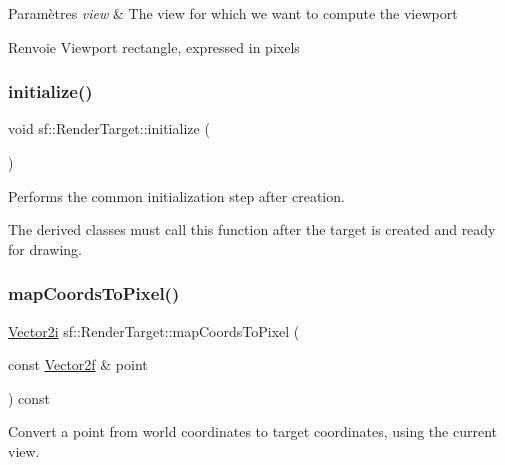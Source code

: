 \begin{DoxyParams}{Paramètres}
{\em view} & The view for which we want to compute the viewport\\
\hline
\end{DoxyParams}
\begin{DoxyReturn}{Renvoie}
Viewport rectangle, expressed in pixels 
\end{DoxyReturn}
\mbox{\label{classsf_1_1RenderTarget_af530274b34159d644e509b4b4dc43eb7}} 
\subsubsection{\texorpdfstring{initialize()}{initialize()}}
{\footnotesize\ttfamily void sf\+::\+Render\+Target\+::initialize (\begin{DoxyParamCaption}{ }\end{DoxyParamCaption})\hspace{0.3cm}{\ttfamily [protected]}}



Performs the common initialization step after creation. 

The derived classes must call this function after the target is created and ready for drawing. \mbox{\label{classsf_1_1RenderTarget_ad92a9f0283aa5f3f67e473c1105b68cf}} 
\subsubsection{\texorpdfstring{map\+Coords\+To\+Pixel()}{mapCoordsToPixel()}\hspace{0.1cm}{\footnotesize\ttfamily [1/2]}}
{\footnotesize\ttfamily \hyperlink{classsf_1_1Vector2}{Vector2i} sf\+::\+Render\+Target\+::map\+Coords\+To\+Pixel (\begin{DoxyParamCaption}\item[{const \hyperlink{classsf_1_1Vector2}{Vector2f} \&}]{point }\end{DoxyParamCaption}) const}



Convert a point from world coordinates to target coordinates, using the current view. 

